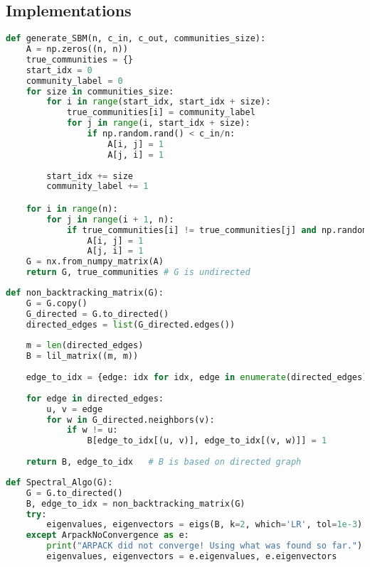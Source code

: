 \begin{appendices}
    
\chapter{Implementations}
\begin{lstlisting}[language=Python, caption=Implementation of Stochastic Block Model for 2 communities case, label=code:SBM for k=2, numbers=none]
def generate_SBM(n, c_in, c_out, communities_size):
    A = np.zeros((n, n))
    true_communities = {}
    start_idx = 0
    community_label = 0
    for size in communities_size:
        for i in range(start_idx, start_idx + size):
            true_communities[i] = community_label
            for j in range(i, start_idx + size):
                if np.random.rand() < c_in/n:
                    A[i, j] = 1
                    A[j, i] = 1
        
        start_idx += size
        community_label += 1

    for i in range(n):
        for j in range(i + 1, n):
            if true_communities[i] != true_communities[j] and np.random.rand() < c_out/n:
                A[i, j] = 1
                A[j, i] = 1
    G = nx.from_numpy_matrix(A)
    return G, true_communities # G is undirected
\end{lstlisting}
\vspace{10mm}
\begin{lstlisting}[language=Python, caption=Implementation of Non-Backtracking Matrix, label=code:non-backtracking, numbers=none]
def non_backtracking_matrix(G):
    G = G.copy()
    G_directed = G.to_directed()
    directed_edges = list(G_directed.edges())
    
    m = len(directed_edges)
    B = lil_matrix((m, m))
    
    edge_to_idx = {edge: idx for idx, edge in enumerate(directed_edges)}
    
    for edge in directed_edges:
        u, v = edge
        for w in G_directed.neighbors(v):
            if w != u:
                B[edge_to_idx[(u, v)], edge_to_idx[(v, w)]] = 1
                
    return B, edge_to_idx   # B is based on directed graph
\end{lstlisting}
\vspace{10mm}
\begin{lstlisting}[language=Python, caption=Implementation of the Spectral Algorithm based on Non-Backtracking Matrix, label=code: spec_algo, numbers=none]
def Spectral_Algo(G):
    G = G.to_directed()
    B, edge_to_idx = non_backtracking_matrix(G)
    try:
        eigenvalues, eigenvectors = eigs(B, k=2, which='LR', tol=1e-3)
    except ArpackNoConvergence as e:
        print("ARPACK did not converge! Using what was found so far.")
        eigenvalues, eigenvectors = e.eigenvalues, e.eigenvectors
    

\end{lstlisting}
\end{appendices}
